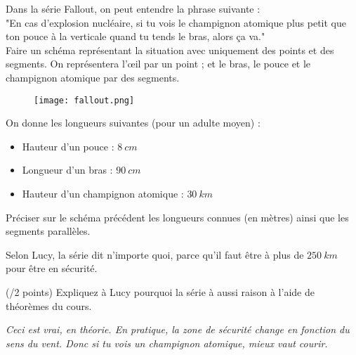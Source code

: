 
\begin{minipage}[t]{0.6\textwidth}
    Dans la série Fallout, on peut entendre la phrase suivante :\\
    "En cas d'explosion nucléaire, si tu vois le champignon atomique plus petit que ton pouce à la verticale quand tu tends le bras, alors ça va."
    \vspace{1em}\\
    \cnt Faire un schéma représentant la situation avec uniquement des points et des segments. On représentera l'œil par un point ; et le bras, le pouce et le champignon atomique par des segments.

\end{minipage}
\hfill
\begin{minipage}[t]{0.35\textwidth}
    \begin{figure}[H]
        \centering
        \texttt{[image: fallout.png]}
    \end{figure}
\end{minipage}

\vspace{4em}
On donne les longueurs suivantes (pour un adulte moyen) :

\begin{itemize}
\item Hauteur d'un pouce : $8~cm$
\item Longueur d'un bras : $90~cm$
\item Hauteur d'un champignon atomique : $30~km$
\end{itemize}
\vspace{1em}
\cnt Préciser sur le schéma précédent les longueurs connues (en mètres) ainsi que les segments parallèles.

Selon Lucy, la série dit n'importe quoi, parce qu'il faut être à plus de $250~km$ pour être en sécurité. 

\cnt (/2 points) Expliquez à Lucy pourquoi la série à aussi raison à l'aide de théorèmes du cours.

\vspace*{\fill}
\textit{Ceci est vrai, en théorie. En pratique, la zone de sécurité change en fonction du sens du vent. Donc si tu vois un champignon atomique, mieux vaut courir.}